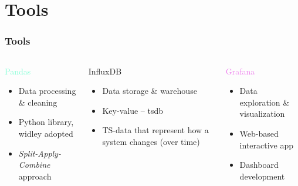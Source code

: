 \section{Tools}
\begin{frame}
    \frametitle{Tools}
    \vspace*{\fill}
    \begin{columns}[onlytextwidth, t]
        \begin{column}{.33\textwidth}
            \centering
            \textcolor{Aquamarine}{\Large Pandas}
            \vspace{0.5cm}

            \begin{itemize}
                \item Data processing \& cleaning
                \item Python library, widley adopted
                \item \textit{Split-Apply-Combine} approach
            \end{itemize}
        \end{column}

        \begin{column}{.33\textwidth}
            \centering
            \textcolor{YellowOrange}{\Large InfluxDB}
            \vspace{0.5cm}
            
            \begin{itemize}
                \item Data storage \& warehouse
                \item Key-value -- \acl{tsdb}
                \item TS-data that represent how a system changes (over time)
            \end{itemize}
        \end{column}


        \begin{column}{.33\textwidth}
            \centering
            \textcolor{violet}{\Large Grafana}
            \vspace{0.5cm}

            \begin{itemize}
                \item Data exploration \& visualization
                \item Web-based interactive app
                \item Dashboard development 
            \end{itemize}
        \end{column}
    \end{columns}
    \vspace*{\fill}
\end{frame}